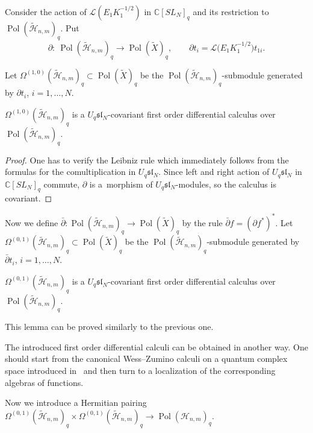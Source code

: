 \documentclass[pdftex]{sigma}
\begin{document}
Consider the action of $\mathcal{L}(E_1K_1^{-1/2})$ in $\mathbb C [SL_N]_q$ and its restriction to
$\operatorname{Pol}(\widetilde{\mathscr{H}}_{n,m})_q$. Put
\[\partial: \
\operatorname{Pol}(\widetilde{\mathscr{H}}_{n,m})_q \rightarrow \operatorname{Pol}(\widetilde{X})_q, \qquad \partial
t_i=\mathcal{L}\big(E_1K_1^{-1/2}\big)t_{1i}.
\]

Let $\Omega^{(1,0)}(\widetilde{\mathscr{H}}_{n,m})_q \subset \operatorname{Pol}(\widetilde{X})_q$ be the
$\operatorname{Pol}(\widetilde{\mathscr{H}}_{n,m})_q$-submodule generated by $\partial t_i$, $i=1,\dots,N$.
\begin{lemma}
$\Omega^{(1,0)}(\widetilde{\mathscr{H}}_{n,m})_q$ is a $U_q \mathfrak{sl}_N$-covariant first order differential calculus
over $\operatorname{Pol}(\widetilde{\mathscr{H}}_{n,m})_q$.
\end{lemma}
\begin{proof} One has to verify the Leibniz rule  which immediately follows from the formulas for the
comultiplication in $U_q \mathfrak{sl}_N$. Since left and right action of $U_q \mathfrak{sl}_N$ in $\mathbb C
[SL_N]_q$ commute, $\partial$ is a~morphism of $U_q \mathfrak{sl}_N$-modules, so the calculus is covariant.
\end{proof}

Now we def\/ine $\bar{\partial}: \operatorname{Pol}(\widetilde{\mathscr{H}}_{n,m})_q \rightarrow
\operatorname{Pol}(\widetilde{X})_q$ by the rule $\bar{\partial}f=(\partial f^*)^*$. Let
$\Omega^{(0,1)}(\widetilde{\mathscr{H}}_{n,m})_q \subset \operatorname{Pol}(\widetilde{X})_q$ be the
$\operatorname{Pol}(\widetilde{\mathscr{H}}_{n,m})_q$-submodule generated by $\bar{\partial} t_i$, $i=1,\dots,N$.
\begin{lemma}
$\Omega^{(0,1)}(\widetilde{\mathscr{H}}_{n,m})_q$ is a $U_q \mathfrak{sl}_N$-covariant first order differential calculus
over $\operatorname{Pol}(\widetilde{\mathscr{H}}_{n,m})_q$.
\end{lemma}

This lemma can be proved similarly to the previous one.
\begin{remark}
The introduced f\/irst order dif\/ferential calculi can be obtained in another
way. One should start from the canonical Wess--Zumino calculi on a quantum
complex space introduced in~\cite{RTF} and then turn to a localization of
the corresponding algebras of functions.
\end{remark}



Now we introduce a Hermitian pairing $\Omega^{(0,1)}(\widetilde{\mathscr{H}}_{n,m})_q \times
\Omega^{(0,1)}(\widetilde{\mathscr{H}}_{n,m})_q \rightarrow \operatorname{Pol}({\mathscr{H}}_{n,m})_q$.
\end{document}
